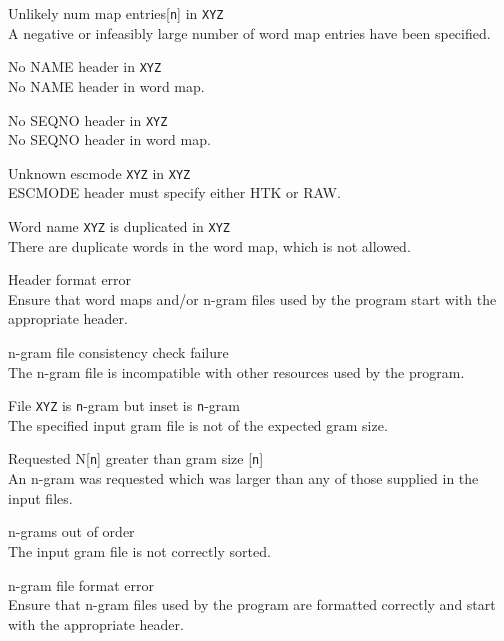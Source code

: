 \begin{itemize}
\begin{itemize}
  Unlikely num map entries[\texttt{n}] in \texttt{XYZ}\\
        A negative or infeasibly large number of word map entries
        have been specified.

 No NAME header in \texttt{XYZ}\\
        No NAME header in word map.

 No SEQNO header in \texttt{XYZ}\\
        No SEQNO header in word map.

 Unknown escmode \texttt{XYZ} in \texttt{XYZ}\\
        ESCMODE header must specify either HTK or RAW.

 Word name \texttt{XYZ} is duplicated in \texttt{XYZ}\\
        There are duplicate words in the word map, which is not allowed.

\end{itemize}



\begin{itemize}
   Header format error\\
        Ensure that word maps and/or n-gram files used by the program start
        with the appropriate header.
\end{itemize}



\begin{itemize}
   n-gram file consistency check failure\\
        The n-gram file is incompatible with other resources used by the
        program.

   File \texttt{XYZ} is \texttt{n}-gram but inset is \texttt{n}-gram\\
        The specified input gram file is not of the expected gram size.

   Requested N[\texttt{n}] greater than gram size [\texttt{n}]\\
        An n-gram was requested which was larger than any of those
        supplied in the input files.

   n-grams out of order\\
        The input gram file is not correctly sorted.

   n-gram file format error\\
        Ensure that n-gram files used by the program are formatted correctly
        and start with the appropriate header.
\end{itemize}



\end{itemize}
